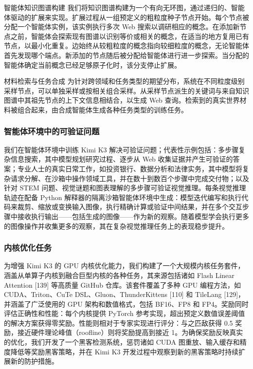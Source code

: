 \documentclass[
  10
]{article}
\begin{document}
智能体知识图谱构建 我们将知识图谱构建为一个有向无环图，通过递归的、智能体驱动的扩展来实现。扩展过程从一组预定义的粗粒度种子节点开始。每个节点被分配一个智能体实例，该实例执行多次 Web 搜索以调研相应的概念。在添加新节点之前，智能体会探索现有图谱以识别等价或相关的概念，在适当的地方复用已有节点，以最小化重复。边始终从较粗粒度的概念指向较细粒度的概念，无论智能体首先发现哪个端点。新添加的节点随后被分配给智能体进行进一步探索。当分配的智能体确定当前概念已经足够原子化时，该分支停止扩展。

材料检索与任务合成 为针对跨领域和任务类型的期望分布，系统在不同粒度级别采样节点，可以单独采样或按相关组合采样。从采样节点派生的关键词与来自知识图谱中其祖先节点的上下文信息相结合，以生成 Web 查询。检索到的真实世界材料被组合起来，由合成智能体生成各种任务类型的训练任务。

\subsubsection{智能体环境中的可验证问题}\label{verifiable-problems-in-agentic-environments}

我们在智能体环境中训练 Kimi K3 解决可验证问题；代表性示例包括：多步骤复杂信息搜索，其中模型规划研究过程、逐步从 Web 收集证据并产生可验证的答案；专业人士的真实日常工作，如投资银行、数据分析和法律实务，其中模型将复杂请求分解、在沙箱中操作领域工具，并在数十到数百个步骤中完成交付物；以及针对 STEM 问题、视觉谜题和图表理解的多步骤可验证视觉推理。每条视觉推理轨迹在配备 Python 解释器的隔离沙箱智能体环境中生成：模型迭代编写和执行代码来裁剪、缩放或变换输入图像，执行精确计算或验证中间结果，并在多个交互步骤中接收执行输出——包括生成的图像——作为新的观察。随着模型学会执行更多的图像操作并收集更多的观察，其在复杂视觉推理任务上的表现稳步提升。

\subsubsection{内核优化任务}\label{kernel-optimization-tasks}

为增强 Kimi K3 的 GPU 内核优化能力，我们构建了一个大规模内核任务套件，涵盖从单算子内核到融合巨型内核的各种任务，其来源包括诸如 Flash Linear Attention {[}139{]} 等高质量 GitHub 仓库。该套件覆盖了多种 GPU 编程方法，如 CUDA、Triton、CuTe DSL、Gluon、ThunderKittens {[}110{]} 和 TileLang {[}129{]}，并涵盖了广泛使用的 GPU 架构和数值格式，包括 BF16、FP8 和 FP4。奖励同时评估正确性和性能：每个内核提供 PyTorch 参考实现，超出预定义数值误差阈值的解决方案获得零奖励。性能则相对于专家实现进行评分：与之匹敌获得 0.5 奖励，接近硬件理论峰值（roofline）则将奖励提高到接近 1。为确保奖励反映真实的优化，我们开发了一个黑客检测系统，惩罚诸如 CUDA 图重放、输入缓存和精度降低等奖励黑客策略，并在 Kimi K3 开发过程中观察到新的黑客策略时持续扩展新的防护措施。
\end{document}
